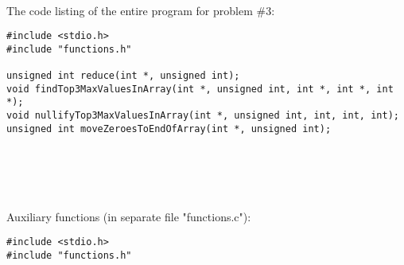 \documentclass{article}
\begin{document}
\paragraph{}\
\paragraph{}\
\paragraph{}\
\paragraph{}\
\paragraph{}\	
\paragraph{}\	
\paragraph{}\
\paragraph{}\	

	
		\rmfamily
		\noindent The code listing of the entire program for problem \#3:
		\begin{verbatim}
#include <stdio.h>
#include "functions.h"

unsigned int reduce(int *, unsigned int);
void findTop3MaxValuesInArray(int *, unsigned int, int *, int *, int *);
void nullifyTop3MaxValuesInArray(int *, unsigned int, int, int, int);
unsigned int moveZeroesToEndOfArray(int *, unsigned int);
		\end{verbatim}
		
		
\paragraph{}\
\paragraph{}\

	\rmfamily
	\noindent Auxiliary functions (in separate file "functions.c"):	
	\begin{verbatim} 
#include <stdio.h>
#include "functions.h"
	\end{verbatim}
		
\end{document}
